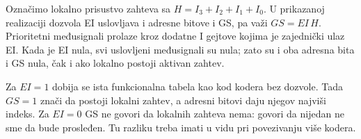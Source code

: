 
Označimo lokalno prisustvo zahteva sa \(H=I_3+I_2+I_1+I_0\). U prikazanoj realizaciji dozvola EI uslovljava i adresne bitove i GS, pa važi \(GS=EI\,H\). Prioritetni međusignali prolaze kroz dodatne I gejtove kojima je zajednički ulaz EI. Kada je EI nula, svi uslovljeni međusignali su nula; zato su i oba adresna bita i GS nula, čak i ako lokalno postoji aktivan zahtev.

Za \(EI=1\) dobija se ista funkcionalna tabela kao kod kodera bez dozvole. Tada \(GS=1\) znači da postoji lokalni zahtev, a adresni bitovi daju njegov najviši indeks. Za \(EI=0\) GS ne govori da lokalnih zahteva nema: govori da nijedan ne sme da bude prosleđen. Tu razliku treba imati u vidu pri povezivanju više kodera.
